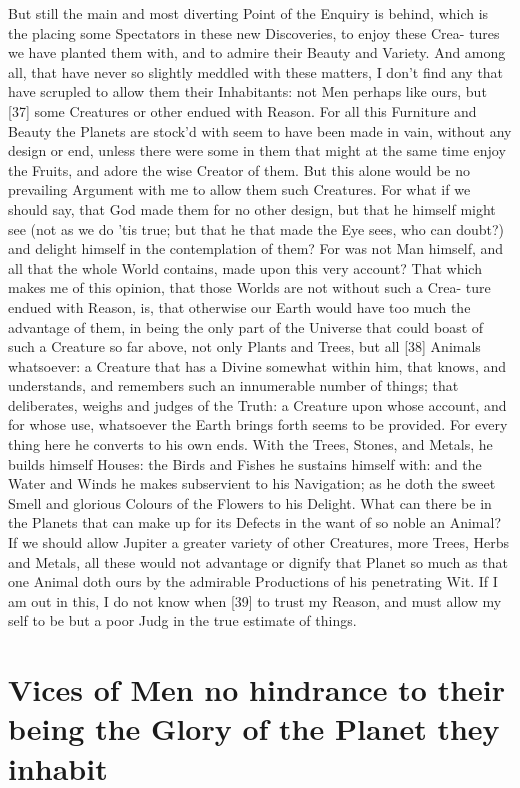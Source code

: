 \documentclass[letterpaper]{book}
\begin{document}
But still the main and most diverting Point of the Enquiry is behind, which
is the placing some Spectators in these new Discoveries, to enjoy these
Crea- tures we have planted them with, and to admire their Beauty and
Variety.  And among all, that have never so slightly meddled with these
matters, I don't find any that have scrupled to allow them their
Inhabitants: not Men perhaps like ours, but [37] some Creatures or other
endued with Reason.  For all this Furniture and Beauty the Planets are
stock'd with seem to have been made in vain, without any design or end,
unless there were some in them that might at the same time enjoy the Fruits,
and adore the wise Creator of them. But this alone would be no prevailing
Argument with me to allow them such Creatures. For what if we should say,
that God made them for no other design, but that he himself might see (not
as we do 'tis true; but that he that made the Eye sees, who can doubt?) and
delight himself in the contemplation of them? For was not Man himself, and
all that the whole World contains, made upon this very account? That which
makes me of this opinion, that those Worlds are not without such a Crea-
ture endued with Reason, is, that otherwise our Earth would have too much
the advantage of them, in being the only part of the Universe that could
boast of such a Creature so far above, not only Plants and Trees, but all
[38] Animals whatsoever: a Creature that has a Divine somewhat within him,
that knows, and understands, and remembers such an innumerable number of
things; that deliberates, weighs and judges of the Truth: a Creature upon
whose account, and for whose use, whatsoever the Earth brings forth seems to
be provided. For every thing here he converts to his own ends. With the
Trees, Stones, and Metals, he builds himself Houses: the Birds and Fishes he
sustains himself with: and the Water and Winds he makes subservient to his
Navigation; as he doth the sweet Smell and glorious Colours of the Flowers
to his Delight. What can there be in the Planets that can make up for its
Defects in the want of so noble an Animal? If we should allow Jupiter a
greater variety of other Creatures, more Trees, Herbs and Metals, all these
would not advantage or dignify that Planet so much as that one Animal doth
ours by the admirable Productions of his penetrating Wit. If I am out in
this, I do not know when [39] to trust my Reason, and must allow my self to
be but a poor Judg in the true estimate of things.


\section{Vices of Men no hindrance to their being the Glory of the Planet
they inhabit}
\end{document}
